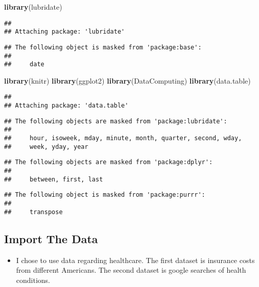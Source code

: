\documentclass[]{article}
\newenvironment{Shaded}{\begin{snugshade}}{\end{snugshade}}
\newcommand{\KeywordTok}[1]{\textcolor[rgb]{0.13,0.29,0.53}{\textbf{#1}}}
\newcommand{\NormalTok}[1]{#1}
\providecommand{\tightlist}{%
  \setlength{\itemsep}{0pt}\setlength{\parskip}{0pt}}
\begin{document}
\begin{Shaded}
\begin{Highlighting}[]
\KeywordTok{library}\NormalTok{(lubridate)}
\end{Highlighting}
\end{Shaded}

\begin{verbatim}
## 
## Attaching package: 'lubridate'
\end{verbatim}

\begin{verbatim}
## The following object is masked from 'package:base':
## 
##     date
\end{verbatim}

\begin{Shaded}
\begin{Highlighting}[]
\KeywordTok{library}\NormalTok{(knitr)}
\KeywordTok{library}\NormalTok{(ggplot2)}
\KeywordTok{library}\NormalTok{(DataComputing)}
\KeywordTok{library}\NormalTok{(data.table)}
\end{Highlighting}
\end{Shaded}

\begin{verbatim}
## 
## Attaching package: 'data.table'
\end{verbatim}

\begin{verbatim}
## The following objects are masked from 'package:lubridate':
## 
##     hour, isoweek, mday, minute, month, quarter, second, wday,
##     week, yday, year
\end{verbatim}

\begin{verbatim}
## The following objects are masked from 'package:dplyr':
## 
##     between, first, last
\end{verbatim}

\begin{verbatim}
## The following object is masked from 'package:purrr':
## 
##     transpose
\end{verbatim}

\hypertarget{import-the-data}{%
\subsection{Import The Data}\label{import-the-data}}

\begin{itemize}
\tightlist
\item
  I chose to use data regarding healthcare. The first dataset is
  insurance costs from different Americans. The second dataset is google
  searches of health conditions.
\end{itemize}
\end{document}
